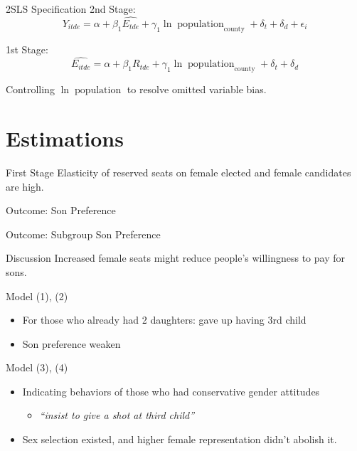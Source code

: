 \documentclass[
  9pt,
  ignorenonframetext,
  aspectratio=43,
]{beamer}
\providecommand{\tightlist}{%
  \setlength{\itemsep}{0pt}\setlength{\parskip}{0pt}}
\begin{document}
\begin{frame}{2SLS Specification}
\protect\hypertarget{sls-specification}{}
2nd Stage: \[
Y_{itde} = \alpha + \beta_1 \hat{E_{tde}} + \gamma_1 \ln \operatorname{population}_{\text{county}} + \delta_t + \delta_{d} + \epsilon_i
\]

1st Stage: \[
\hat{E_{itde}} = \alpha + \beta_1 R_{tde}  + \gamma_1 \ln \operatorname{population}_{\text{county}} + \delta_t + \delta_{d}
\]

Controlling \(\ln \operatorname{population}\) to resolve omitted
variable bias.
\end{frame}

\hypertarget{estimations}{%
\section{Estimations}\label{estimations}}

\begin{frame}{First Stage}
\protect\hypertarget{first-stage}{}
Elasticity of reserved seats on female elected and female candidates are
high.


\end{frame}

\begin{frame}{Outcome: Son Preference}
\protect\hypertarget{outcome-son-preference}{}

\end{frame}

\begin{frame}{Outcome: Subgroup Son Preference}
\protect\hypertarget{outcome-subgroup-son-preference}{}

\end{frame}

\begin{frame}{Discussion}
\protect\hypertarget{discussion}{}
Increased female seats might reduce people's willingness to pay for
sons.

\begin{block}{Model (1), (2)}
\protect\hypertarget{model-1-2}{}
\begin{itemize}
\tightlist
\item
  For those who already had 2 daughters: gave up having 3rd child
\item
  Son preference weaken
\end{itemize}
\end{block}

\begin{block}{Model (3), (4)}
\protect\hypertarget{model-3-4}{}
\begin{itemize}
\tightlist
\item
  Indicating behaviors of those who had conservative gender attitudes

  \begin{itemize}
  \tightlist
  \item
    \emph{``insist to give a shot at third child''}
  \end{itemize}
\item
  Sex selection existed, and higher female representation didn't abolish
  it.
\end{itemize}
\end{block}
\end{frame}
\end{document}
